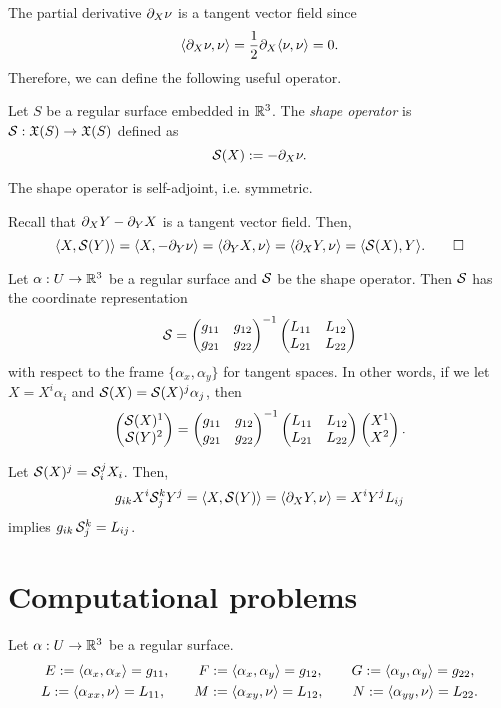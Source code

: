 \documentclass{../note}
\def\a{\alpha}
\begin{document}
The partial derivative $\pd_X\nu$ is a tangent vector field since
\[\<\pd_X\nu,\nu\>=\frac12\pd_X\<\nu,\nu\>=0.\]
Therefore, we can define the following useful operator.
\begin{defn}
Let $S$ be a regular surface embedded in $\mathbb{R}^3$.
The \emph{shape operator} is $\mathcal{S}:\mathfrak{X}(S)\to\mathfrak{X}(S)$ defined as
\[\cS(X):=-\pd_X\nu.\]
\end{defn}
\begin{prop}
The shape operator is self-adjoint, i.e. symmetric.
\end{prop}
\begin{pf}
Recall that $\pd_XY-\pd_YX$ is a tangent vector field.
Then,
\[\<X,\cS(Y)\>=\<X,-\pd_Y\nu\>=\<\pd_YX,\nu\>=\<\pd_XY,\nu\>=\<\cS(X),Y\>.\qedhere\]
\end{pf}


\begin{thm}
Let $\a:U\to\R^3$ be a regular surface and $\mathcal{S}$ be the shape operator.
Then $\mathcal{S}$ has the coordinate representation
\[\mathcal{S}=\begin{pmatrix}g_{11}&g_{12}\\g_{21}&g_{22}\end{pmatrix}^{-1}\begin{pmatrix}L_{11}&L_{12}\\L_{21}&L_{22}\end{pmatrix}\]
with respect to the frame $\{\a_x,\a_y\}$ for tangent spaces.
In other words, if we let $X=X^i\a_i$ and $\cS(X)=\cS(X)^j\a_j$, then
\[\begin{pmatrix}\mathcal{S}(X)^1\\\mathcal{S}(Y)^2\end{pmatrix}=\begin{pmatrix}g_{11}&g_{12}\\g_{21}&g_{22}\end{pmatrix}^{-1}\begin{pmatrix}L_{11}&L_{12}\\L_{21}&L_{22}\end{pmatrix}\begin{pmatrix}X^1\\X^2\end{pmatrix}.\]
\end{thm}
\begin{pf}
Let $\mathcal{S}(X)^j=\mathcal{S}_i^jX_i$.
Then,
\[g_{ik}X^i\cS_j^kY^j=\<X,\cS(Y)\>=\<\pd_XY,\nu\>=X^iY^jL_{ij}\]
implies $g_{ik}\,\mathcal{S}_j^k=L_{ij}$.
\end{pf}






\section{Computational problems}

\begin{defn}
Let $\a:U\to\R^3$ be a regular surface.
\begin{gather*}
E:=\<\a_x,\a_x\>=g_{11},\qquad F:=\<\a_x,\a_y\>=g_{12},\qquad G:=\<\a_y,\a_y\>=g_{22},\\
L:=\<\a_{xx},\nu\>=L_{11},\qquad M:=\<\a_{xy},\nu\>=L_{12},\qquad N:=\<\a_{yy},\nu\>=L_{22}.
\end{gather*}
\end{defn}
\end{document}
